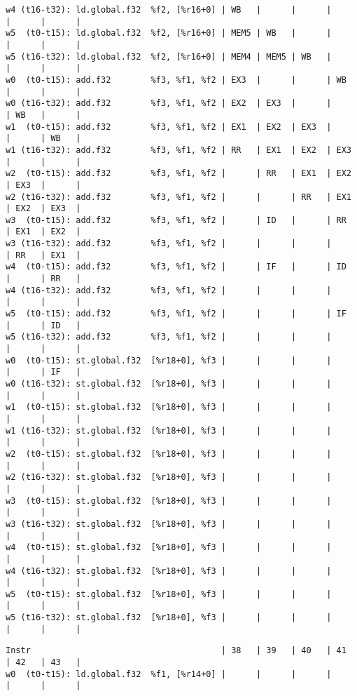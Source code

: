 \documentclass[11pt]{article}
\begin{document}
\begin{Answer}
\begin{verbatim}
w4 (t16-t32): ld.global.f32  %f2, [%r16+0] | WB   |      |      |      |      |      |
w5  (t0-t15): ld.global.f32  %f2, [%r16+0] | MEM5 | WB   |      |      |      |      |
w5 (t16-t32): ld.global.f32  %f2, [%r16+0] | MEM4 | MEM5 | WB   |      |      |      |
w0  (t0-t15): add.f32        %f3, %f1, %f2 | EX3  |      |      | WB   |      |      |
w0 (t16-t32): add.f32        %f3, %f1, %f2 | EX2  | EX3  |      |      | WB   |      |
w1  (t0-t15): add.f32        %f3, %f1, %f2 | EX1  | EX2  | EX3  |      |      | WB   |
w1 (t16-t32): add.f32        %f3, %f1, %f2 | RR   | EX1  | EX2  | EX3  |      |      |
w2  (t0-t15): add.f32        %f3, %f1, %f2 |      | RR   | EX1  | EX2  | EX3  |      |
w2 (t16-t32): add.f32        %f3, %f1, %f2 |      |      | RR   | EX1  | EX2  | EX3  |
w3  (t0-t15): add.f32        %f3, %f1, %f2 |      | ID   |      | RR   | EX1  | EX2  |
w3 (t16-t32): add.f32        %f3, %f1, %f2 |      |      |      |      | RR   | EX1  |
w4  (t0-t15): add.f32        %f3, %f1, %f2 |      | IF   |      | ID   |      | RR   |
w4 (t16-t32): add.f32        %f3, %f1, %f2 |      |      |      |      |      |      |
w5  (t0-t15): add.f32        %f3, %f1, %f2 |      |      |      | IF   |      | ID   |
w5 (t16-t32): add.f32        %f3, %f1, %f2 |      |      |      |      |      |      |
w0  (t0-t15): st.global.f32  [%r18+0], %f3 |      |      |      |      |      | IF   |
w0 (t16-t32): st.global.f32  [%r18+0], %f3 |      |      |      |      |      |      |
w1  (t0-t15): st.global.f32  [%r18+0], %f3 |      |      |      |      |      |      |
w1 (t16-t32): st.global.f32  [%r18+0], %f3 |      |      |      |      |      |      |
w2  (t0-t15): st.global.f32  [%r18+0], %f3 |      |      |      |      |      |      |
w2 (t16-t32): st.global.f32  [%r18+0], %f3 |      |      |      |      |      |      |
w3  (t0-t15): st.global.f32  [%r18+0], %f3 |      |      |      |      |      |      |
w3 (t16-t32): st.global.f32  [%r18+0], %f3 |      |      |      |      |      |      |
w4  (t0-t15): st.global.f32  [%r18+0], %f3 |      |      |      |      |      |      |
w4 (t16-t32): st.global.f32  [%r18+0], %f3 |      |      |      |      |      |      |
w5  (t0-t15): st.global.f32  [%r18+0], %f3 |      |      |      |      |      |      |
w5 (t16-t32): st.global.f32  [%r18+0], %f3 |      |      |      |      |      |      |
\end{verbatim}
	\newpage
	\begin{verbatim}
Instr                                      | 38   | 39   | 40   | 41   | 42   | 43   |
w0  (t0-t15): ld.global.f32  %f1, [%r14+0] |      |      |      |      |      |      |

\end{verbatim}
\end{Answer}
\end{document}
